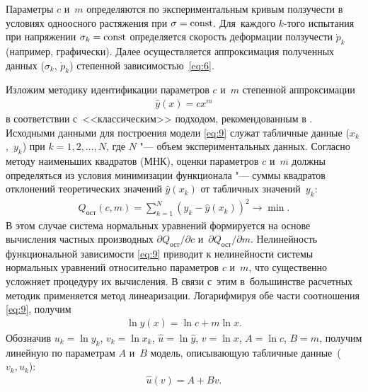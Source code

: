 Параметры $c$ и~$m$ определяются по экспериментальным кривым ползучести в условиях одноосного растяжения при $\sigma={\rm const}$.
Для~каждого $k$-того испытания при напряжении $\sigma_k={\rm const}$ определяется скорость деформации ползучести $\dot{p}_k$ (например, графически). 
Далее осуществляется аппроксимация полученных данных ($\sigma_k$, $\dot{p}_k$) степенной зависимостью~\eqref{eq:6}.

\smallskip

\hypertarget{ts:3}{}

Изложим методику идентификации параметров $c$ и~$m$ степенной аппроксимации 
\begin{gather} \label{eq:9}
	\hat{y}(x) = c x^m
\end{gather}
в соответствии с~<<классическим>> подходом, рекомендованным в \cite{Lvovskiy}.
Исходными данными для построения модели \eqref{eq:9} служат табличные данные \mbox{($x_k$, $y_k$)} при $k=1,2,\dots,N$, где $N$ "--- объем экспериментальных данных.
Согласно методу наименьших квадратов (МНК), оценки параметров $c$ и~$m$ должны определяться из условия минимизации функционала "--- суммы квадратов отклонений теоретических значений $\hat{y}(x_k)$ от табличных значений~$y_k$:
\begin{gather*}
	Q_\text{ост}(c,m) = \sum  _{k=1}^{N} \left(y_k - \hat{y}(x_k)\right)^2 \rightarrow \min.
\end{gather*}
В этом случае система нормальных уравнений формируется на основе вычисления частных производных ${\partial Q_\text{ост}}/{\partial c}$ и~${\partial Q_\text{ост}}/{\partial m}$. 
Нелинейность функциональной зависимости \eqref{eq:9} приводит к нелинейности системы нормальных уравнений относительно параметров $c$ и~$m$, что существенно усложняет процедуру их вычисления.
В связи с~этим в~большинстве расчетных методик  применяется метод линеаризации. Логарифмируя обе части соотношения \eqref{eq:9}, получим
\begin{gather}
	 \ln \hat{y}(x) = \ln c + m \ln x.
\end{gather}
Обозначив $u_k=\ln y_k$, $v_k=\ln x_k$, $\hat{u}=\ln \hat{y}$, $v=\ln x$, $A=\ln c$, $B=m$, получим линейную по параметрам $A$ и~$B$ модель, описывающую табличные данные~($v_k, u_k$):
\begin{gather} \label{eq:10}
	 \hat{u}(v) = A + B v.
\end{gather}

